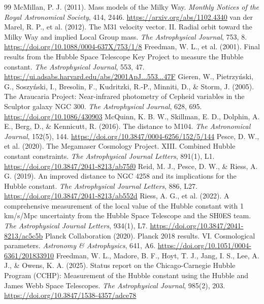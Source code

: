 \documentclass[11pt]{article}
\begin{document}
\begin{thebibliography}{99}
McMillan, P. J. (2011). Mass models of the Milky Way. \textit{Monthly Notices of the Royal Astronomical Society}, 414, 2446. \url{https://arxiv.org/abs/1102.4340}
van der Marel, R. P., et al. (2012). The M31 velocity vector. II. Radial orbit toward the Milky Way and implied Local Group mass. \textit{The Astrophysical Journal}, 753, 8. \url{https://doi.org/10.1088/0004-637X/753/1/8}
Freedman, W. L., et al. (2001). Final results from the Hubble Space Telescope Key Project to measure the Hubble constant. \textit{The Astrophysical Journal}, 553, 47. \url{https://ui.adsabs.harvard.edu/abs/2001ApJ...553...47F}
Gieren, W., Pietrzy\'nski, G., Soszy\'nski, I., Bresolin, F., Kudritzki, R.-P., Minniti, D., \& Storm, J. (2005). The Araucaria Project: Near-infrared photometry of Cepheid variables in the Sculptor galaxy NGC 300. \textit{The Astrophysical Journal}, 628, 695. \url{https://doi.org/10.1086/430903}
McQuinn, K. B. W., Skillman, E. D., Dolphin, A. E., Berg, D., \& Kennicutt, R. (2016). The distance to M104. \textit{The Astronomical Journal}, 152(5), 144. \url{https://doi.org/10.3847/0004-6256/152/5/144}
Pesce, D. W., et al. (2020). The Megamaser Cosmology Project. XIII. Combined Hubble constant constraints. \textit{The Astrophysical Journal Letters}, 891(1), L1. \url{https://doi.org/10.3847/2041-8213/ab75f0}
Reid, M. J., Pesce, D. W., \& Riess, A. G. (2019). An improved distance to NGC 4258 and its implications for the Hubble constant. \textit{The Astrophysical Journal Letters}, 886, L27. \url{https://doi.org/10.3847/2041-8213/ab552d}
Riess, A. G., et al. (2022). A comprehensive measurement of the local value of the Hubble constant with 1 km/s/Mpc uncertainty from the Hubble Space Telescope and the SH0ES team. \textit{The Astrophysical Journal Letters}, 934(1), L7. \url{https://doi.org/10.3847/2041-8213/ac5c5b}
Planck Collaboration (2020). Planck 2018 results. VI. Cosmological parameters. \textit{Astronomy \& Astrophysics}, 641, A6. \url{https://doi.org/10.1051/0004-6361/201833910}
Freedman, W. L., Madore, B. F., Hoyt, T. J., Jang, I. S., Lee, A. J., \& Owens, K. A. (2025). Status report on the Chicago-Carnegie Hubble Program (CCHP): Measurement of the Hubble constant using the Hubble and James Webb Space Telescopes. \textit{The Astrophysical Journal}, 985(2), 203. \url{https://doi.org/10.3847/1538-4357/adce78}

\end{thebibliography}
\end{document}

